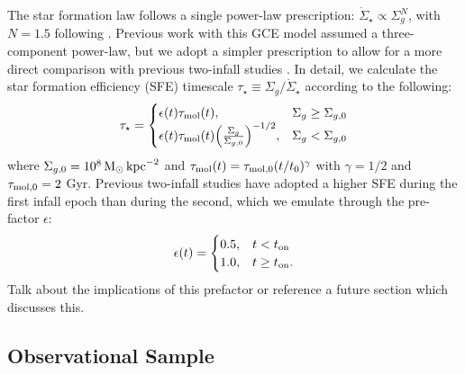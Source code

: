 \documentclass[twocolumn,twocolappendix,linenumbers]{aastex631}
\newcommand{\todo}[1]{{\color{red}#1}}
\begin{document}
The star formation law follows a single power-law prescription: $\dot\Sigma_\star\propto\Sigma_g^N$, with $N=1.5$ following \citet{kennicutt_global_1998}. Previous work with this GCE model \citep[e.g.,][]{johnson_stellar_2021,dubay_galactic_2024} assumed a three-component power-law, but we adopt a simpler prescription to allow for a more direct comparison with previous two-infall studies \citep[e.g.,][]{spitoni_remind_2024}. In detail, we calculate the star formation efficiency (SFE) timescale $\tau_\star\equiv\Sigma_g/\dot\Sigma_\star$ according to the following:
\begin{equation}
    \label{eq:sf-law}
    \tau_\star = 
    \begin{cases}
        \epsilon(t) \tau_{\rm mol}(t),   & \Sigma_g \ge \Sigma_{g,0} \\
        \epsilon(t) \tau_{\rm mol}(t) \Big(\frac{\Sigma_g}{\Sigma_{g,0}}\Big)^{-1/2}, & \Sigma_g < \Sigma_{g,0}
    \end{cases}
\end{equation}
where $\Sigma_{g,0} = 10^8\,{\rm M}_\odot\,{\rm kpc}^{-2}$ and $\tau_{\rm mol}(t)=\tau_{\rm mol,0}(t/t_0)^\gamma$ with $\gamma=1/2$ and $\tau_{\rm mol,0}=2$ Gyr. Previous two-infall studies \citep[e.g.,][]{nissen_high-precision_2020} have adopted a higher SFE during the first infall epoch than during the second, which we emulate through the pre-factor $\epsilon$:
\begin{equation}
    \label{eq:sfe-prefactor}
    \epsilon(t) = 
    \begin{cases}
        0.5, & t < t_{\rm on} \\
        1.0, & t \ge t_{\rm on}.
    \end{cases}
\end{equation}
\todo{Talk about the implications of this prefactor or reference a future section which discusses this.}

\subsection{Observational Sample}
\label{sec:observational-sample}
\end{document}
